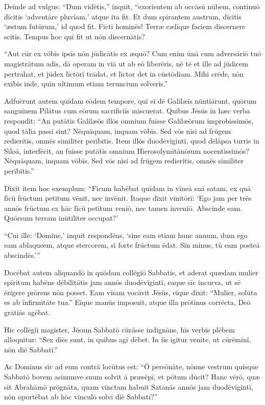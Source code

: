 \Versus Deinde ad vulgus: ``Dum vidētis,'' inquit, ``exorientem ab occāsū nūbem, continuō dīcitis `adventāre pluviam,' atque ita fit.
\Versus Et dum spīrantem austrum, dīcitis `æstum futūrum,' id quod fit.
\Versus Fictī hominēs! Terræ cælīque faciem discernere scītis. Tempus hoc quī fit ut nōn discernātis?

\Versus ``Aut cūr ex vōbīs ipsīs nōn jūdicātis ex æquō?
\Versus Cum enim ūnā cum adversāriō tuō magistrātum adīs, dā operam in viā ut ab eō līberēris, nē tē et ille ad jūdicem pertrahat, et jūdex līctōrī trādat, et līctor det in cūstōdiam.
\Versus Mihi crēde, nōn exībis inde, quīn ultimum etiam teruncium solveris.''



\Caput
\Versus Adfuērunt autem quīdam eōdem tempore, quī eī dē Galilæīs nūntiārunt, quōrum sanguinem Pīlātus cum eōrum sacrificiīs miscuerat.
\Versus Quibus Jēsūs in hæc verba respondit: ``An putātis Galilæōs illōs omnium fuisse Galilæōrum improbissimōs, quod tālia passī sint?
\Versus Nēquāquam, inquam vōbīs. Sed vōs nisi ad frūgem redieritis, omnēs similiter perībitis.
\Versus Item illōs duodēvīgintī, quod dēlāpsa turris in Siloā, interfēcit, an fuisse putātis omnium Hierosolymītānōrum nocentissimōs?
\Versus Nēquāquam, inquam vōbīs. Sed vōs nisi ad frūgem redieritis, omnēs similiter perībitis.''

\Versus Dīxit item hoc exemplum: ``Fīcum habēbat quīdam in vīneā suā satam, ex quā fīcū frūctum petītum vēnit, nec invēnit.
\Versus Itaque dīxit vīnitōrī: `Ego jam per trēs annōs frūctum ex hāc fīcū petītum veniō, nec tamen inveniō. Abscinde eam. Quōrsum terram inūtiliter occupat?'

\Versus ``Cui ille: `Domine,' inquit respondēns, `sine eam etiam hunc annum, dum ego eam ablaqueem, atque stercorem,
\Versus sī forte frūctum ēdat. Sīn minus, tū eam posteā abscindēs.'{}''

\Versus Docēbat autem aliquandō in quōdam collēgiō Sabbatīs,
\Versus et aderat quædam mulier spīritum habēns dēbilitātis jam annōs duodēvīgintī, eaque sīc incurva, ut sē ērigere prōrsus nōn posset.
\Versus Eam vīsam vocāvit Jēsūs, eīque dīxit: ``Mulier, solūta es ab īnfirmitāte tua.''
\Versus Eīque manūs imposuit, atque illa prōtinus corrēcta, Deō grātiās agēbat.

\Versus Hīc collēgiī magister, Jēsum Sabbatō cūrāsse indignāns, hīs verbīs plēbem alloquitur: ``Sex diēs sunt, in quibus agī dēbet. In iīs igitur venīte, ut cūrēminī, nōn diē Sabbatī.''

\Versus Ac Dominus sīc ad eum contrā locūtus est: ``Ō persōnāte, nōnne vestrum quisque Sabbatō bovem asinumve suum solvit ā præsēpī, et pōtum dūcit?
\Versus Hanc vērō, quæ sit Abrahāmō prōgnāta, quam vīnctam habuit Satanās annōs jam duodēvīgintī, nōn oportēbat ab hōc vinculō solvī diē Sabbatī?''

